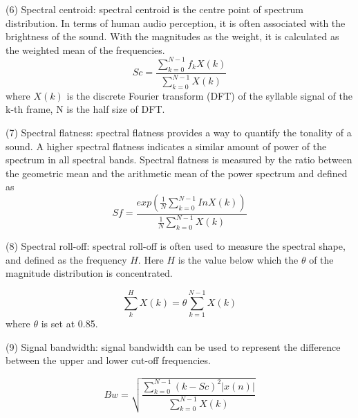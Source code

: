 



\vspace{3mm}
\noindent(6) Spectral centroid: spectral centroid is the centre point of spectrum distribution. In terms of human audio perception, it is often associated with the brightness of the sound. With the magnitudes as the weight, it is calculated as the weighted mean of the frequencies.
\begin{equation}
Sc=\frac{\sum_{k=0}^{N-1}f_{k}X(k)}{\sum_{k=0}^{N-1}X(k)}
\end{equation}
where $X(k)$ is the discrete Fourier transform (DFT) of the syllable signal of the k-th frame, N is the half size of DFT. 

\vspace{3mm}
\noindent(7) Spectral flatness: spectral flatness provides a way to quantify the tonality of a sound. A higher spectral flatness indicates a similar amount of power of the spectrum in all spectral bands. Spectral flatness is measured by the ratio between the geometric mean and the arithmetic mean of the power spectrum and defined as
\begin{equation}
Sf = \frac{exp(\frac{1}{N}\sum_{k=0}^{N-1}InX(k))}{\frac{1}{N}\sum_{k=0}^{N-1}X(k)}
\end{equation}

\vspace{3mm}

\noindent(8) Spectral roll-off: spectral roll-off is often used to measure the spectral shape, and defined as the frequency $H$. Here $H$ is the value below which the $\theta$ of the magnitude distribution is concentrated.

\begin{equation}
\sum_{k}^{H}X(k)=\theta \sum_{k=1}^{N-1}X(k)
\end{equation}
where $\theta$ is set at 0.85.

\vspace{3mm}

\noindent(9) Signal bandwidth: signal bandwidth can be used to represent the difference between the upper and lower cut-off frequencies.

\begin{equation}
Bw=\sqrt{\frac{\sum_{k=0}^{N-1}(k-Sc)^{2}|x(n)|}{\sum_{k=0}^{N-1}X(k)}}
\end{equation} 

\vspace{3mm}

